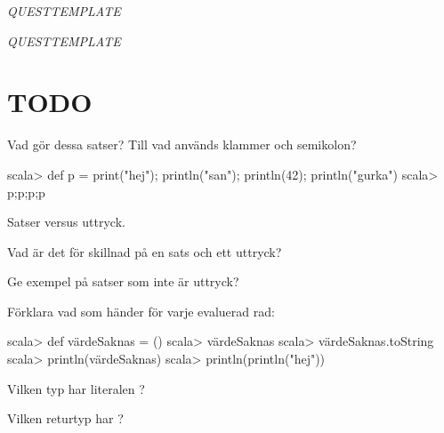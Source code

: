 {\QUESTEND




\def\what{\emph{QUESTTEMPLATE}}

\QUESTBEGIN

\Task \what

\Subtask

\SOLUTION

\TaskSolved \what

\SubtaskSolved 

\QUESTEND




\section{TODO}



\ifPreSolution  %


\Task\Pen Vad gör dessa satser? Till vad används klammer och semikolon? %
\begin{REPLnonum}
scala> def p = { print("hej"); println("san"); println(42); println("gurka") }
scala> p;p;p;p
\end{REPLnonum}

\Task\Pen Satser versus uttryck. %

\Subtask Vad är det för skillnad på en sats och ett uttryck?

\Subtask Ge exempel på satser som inte är uttryck?

\Subtask Förklara vad som händer för varje evaluerad rad:
\begin{REPL}
scala> def värdeSaknas = ()
scala> värdeSaknas
scala> värdeSaknas.toString
scala> println(värdeSaknas)
scala> println(println("hej"))
\end{REPL}

\Subtask Vilken typ har literalen \code{()}?

\Subtask Vilken returtyp har ?







}

